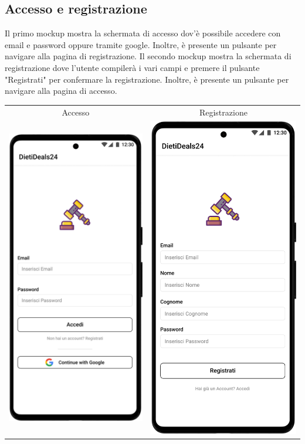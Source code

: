 \subsection{Accesso e registrazione}
Il primo mockup mostra la schermata di accesso dov'è possibile accedere con email e password oppure tramite google.
Inoltre, è presente un pulsante per navigare alla pagina di registrazione.\sskip
Il secondo mockup mostra la schermata di registrazione dove l'utente compilerà i vari campi e premere il pulsante "Registrati" per confermare la registrazione.
Inoltre, è presente un pulsante per navigare alla pagina di accesso.
\begin{center}
	\begin{tabular}{cc}
		Accesso                                                          &
		Registrazione                                                          \\
		\includegraphics[width=.35\textwidth]{assets/mockup/Accesso.png} &
		\includegraphics[width=.35\textwidth]{assets/mockup/Registrazione.png} \\
	\end{tabular}
\end{center}

